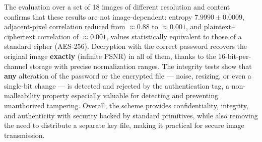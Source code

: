 \documentclass{llncs}
\begin{document}
The evaluation over a set of 18 images of different resolution and content
confirms that these results are not image-dependent: entropy
$7.9990 \pm 0.0009$, adjacent-pixel correlation reduced from $\approx 0.88$ to
$\approx 0.001$, and plaintext--ciphertext correlation of $\approx 0.001$,
values statistically equivalent to those of a standard cipher (AES-256).
Decryption with the correct password recovers the original image
\textbf{exactly} (infinite PSNR) in all of them, thanks to the
16-bit-per-channel storage
with precise normalization ranges. The integrity tests show that \textbf{any}
alteration of the password or the encrypted file --- noise, resizing, or even
a single-bit change --- is detected and rejected by the authentication tag, a
non-malleability property especially valuable for detecting and preventing
unauthorized tampering. Overall, the scheme provides confidentiality,
integrity, and authenticity with security backed by standard primitives, while
also removing the need to distribute a separate key file, making it practical
for secure image transmission.
\end{document}
